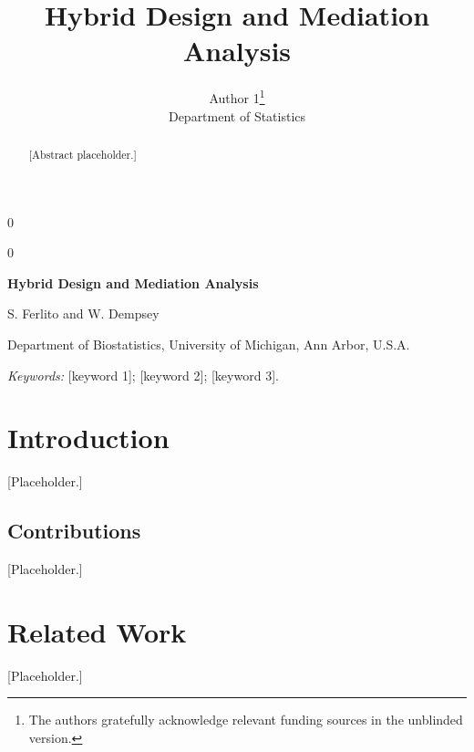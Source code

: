 \documentclass[12pt]{article}
\newcommand{\blind}{0}
\def\spacingset#1{\renewcommand{\baselinestretch}{#1}\small\normalsize}
\begin{document}
\blind
{
  \title{\bf Hybrid Design and Mediation Analysis}
  \author{Author 1\thanks{The authors gratefully acknowledge relevant funding sources in the unblinded version.}\\
    Department of Statistics}
  \maketitle
} \fi

\blind
{
  \bigskip
  \bigskip
  \bigskip
  \begin{center}
    {\LARGE\bf Hybrid Design and Mediation Analysis}

    \medskip
    S. Ferlito and W. Dempsey

    Department of Biostatistics, University of Michigan, Ann Arbor, U.S.A.
  \end{center}
  \medskip
} \fi

\begin{abstract}
[Abstract placeholder.]
\end{abstract}

\noindent%
{\it Keywords:} [keyword 1]; [keyword 2]; [keyword 3].
\vfill

\newpage
\spacingset{1.45} %

\section{Introduction}
\label{sec:intro}
[Placeholder.]

\subsection{Contributions}
\label{sec:contributions}
[Placeholder.]

\section{Related Work}
\label{sec:related}
[Placeholder.]
\end{document}
